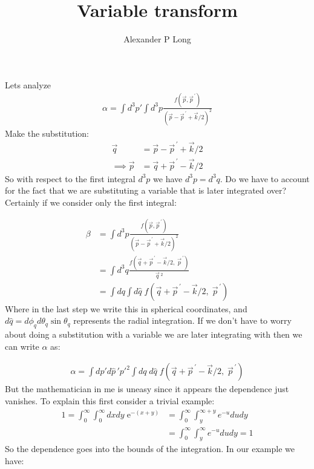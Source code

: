 \documentclass[11pt]{article}
\author{Alexander P Long}
\title{Variable transform}
\newcommand\ddfrac[2]{\frac{\displaystyle #1}{\displaystyle #2}}
\newcommand{\e}{\mathrm{e}}
\newcommand\vp[1]{\vec{#1}^{\,\prime}}
\newcommand\vsp[1]{\vec{#1}\,}
\begin{document}
\maketitle

Lets analyze 
\begin{align}
    \alpha= \int d^3 p' \int d^3 p \ddfrac{f(\vec{p},\vp{p})}{(\vec{p}-\vp{p}+\vec{k}/2)^2}  
\end{align}
Make the substitution:
\begin{align}
    \vec{q}&=\vec{p}-\vp{p}+\vec{k}/2\\
    \implies \vec{p}&=\vec{q}+\vp{p} - \vec{k}/2
\end{align}
So with respect to the first integral $d^3p$ we have $d^3p =d^3q$. Do we have to account for the fact that we are substituting a variable that is later integrated over? Certainly if we consider only the first integral:

\begin{align}
    \beta&= \int d^3 p \ddfrac{f(\vec{p},\vp{p})}{(\vec{p}-\vp{p}+\vec{k}/2)^2}\\
         &= \int d^3 q \ddfrac{f(\vec{q}+\vp{p}-\vec{k}/2,\;\vp{p})}{\vsp{q}^2}\\
         &= \int dq\int d\widehat{q}\;f(\vec{q}+\vp{p}-\vec{k}/2,\;\vp{p})
\end{align}
Where in the last step we write this in spherical coordinates, and $d\widehat{q}=d\phi_q d\theta_q \sin{\theta_q}$ represents the radial integration.
If we don't have to worry about doing a substitution with a variable we are later integrating with then we can write $\alpha$ as:

\begin{align}
    \alpha = \int dp' d\widehat{p}\,'p'^2\int dq\;d\widehat{q}\;f(\vec{q}+\vp{p}-\vec{k}/2,\;\vp{p})
\end{align}
But the mathematician in me is uneasy since it appears the dependence just vanishes. To explain this first consider a trivial example:
\begin{align}
    1=\int_0^\infty \int_0^\infty dx dy\; \e^{-(x+y)} &= \int_0^\infty \int_y^{\infty+y}  e^{-u} du dy\\
                                                    &= \int_0^\infty \int_y^\infty  e^{-u} du dy=1
\end{align}
So the dependence goes into the bounds of the integration. In our example we have:
\end{document}

